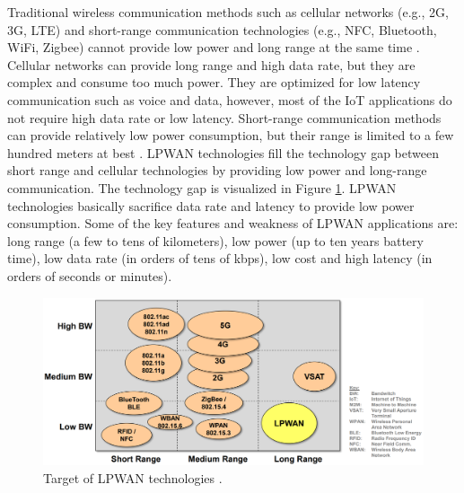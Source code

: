 Traditional wireless communication methods such as cellular networks (e.g., 2G, 3G, LTE) and short-range communication technologies (e.g., NFC, Bluetooth, WiFi, Zigbee) cannot provide low power and long range at the same time \cite{finnegan2018comparative}. Cellular networks can provide long range and high data rate, but they are complex and consume too much power. They are optimized for low latency communication such as voice and data, however, most of the IoT applications do not require high data rate or low latency. Short-range communication methods can provide relatively low power consumption, but their range is limited to a few hundred meters at best \cite{7815384}. LPWAN technologies fill the technology gap between short range and cellular technologies by providing low power and long-range communication. The technology gap is visualized in Figure \ref{fig:lpwan_gap}. LPWAN technologies basically sacrifice data rate and latency to provide low power consumption. Some of the key features and weakness of LPWAN applications are: long range (a few to tens of kilometers), low power (up to ten years battery time), low data rate (in orders of tens of kbps), low cost and high latency (in orders of seconds or minutes).

\begin{figure}[h]
\centering
\includegraphics[width=\linewidth]{fig/lpwan_gap.png}
\vspace*{3mm}
\caption{Target of LPWAN technologies \cite{peteregli_lpwan}.}
\label{fig:lpwan_gap}
\end{figure}


